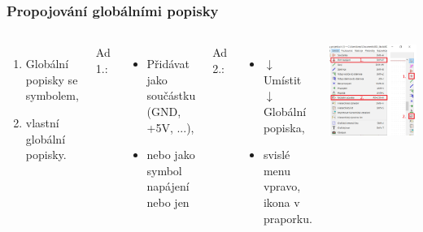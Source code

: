 \documentclass{beamer}
\begin{document}
\begin{frame}
	\frametitle{Propojování globálními popisky}
	\begin{columns}
	
		\small
		\begin{enumerate}
			\item Globální popisky se symbolem,
			\item vlastní globální popisky.
		\end{enumerate}
		
		Ad 1.:
		\begin{itemize}
			\item Přidávat jako součástku (GND, +5V, ...),
			\item nebo jako symbol napájení  nebo jen 
		\end{itemize}
		
		Ad 2.:
		\begin{itemize}
			\item $\downarrow$ Umístit $\downarrow$ Globální popiska,
			\item svislé menu vpravo, ikona  v praporku.
		\end{itemize}
		
		\begin{center}
			\includegraphics[width=\textwidth]{obr/spoje03.png}
		\end{center}
		
	\end{columns}
\end{frame}
\end{document}
